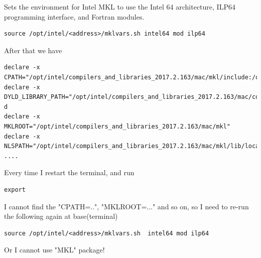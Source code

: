 Sets the environment for Intel MKL to use the Intel 64 architecture, ILP64 programming interface, and Fortran modules.
\begin{verbatim}
source /opt/intel/<address>/mklvars.sh intel64 mod ilp64
\end{verbatim}

After that we have 
\begin{verbatim}
declare -x CPATH="/opt/intel/compilers_and_libraries_2017.2.163/mac/mkl/include:/opt/intel/compilers_and_libraries_2017.2.163/mac/mkl/include/intel64_mac/ilp64"
declare -x DYLD_LIBRARY_PATH="/opt/intel/compilers_and_libraries_2017.2.163/mac/compiler/lib:/opt/intel/compilers_and_libraries_2017.2.163/mac/mkl/lib"
d
declare -x MKLROOT="/opt/intel/compilers_and_libraries_2017.2.163/mac/mkl"
declare -x NLSPATH="/opt/intel/compilers_and_libraries_2017.2.163/mac/mkl/lib/locale/%l_%t/%N"
....
\end{verbatim}

Every time I restart the terminal,  and run 
\begin{verbatim}
export
\end{verbatim}
I cannot find the "CPATH=..", "MKLROOT=..." and so on, so I need to re-run the following again at base(terminal)
\begin{verbatim}
source /opt/intel/<address>/mklvars.sh  intel64 mod ilp64
\end{verbatim}
Or I cannot use "MKL" package!


